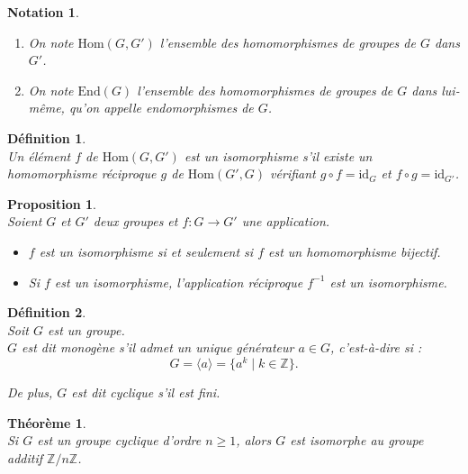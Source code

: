 \documentclass[a4paper, 14pt]{report}
\newtheorem{definition}{Définition}[section]
\newtheorem{notation}{Notation}[section]
\newtheorem{proposition}{Proposition}[section]
\newtheorem{theorem}{Théorème}[section]
\begin{document}
\begin{onehalfspace}
{\begin{notation} \
	\begin{enumerate} [label=\roman*)]
		\item On note $\mathrm{Hom}(G, G')$ l’ensemble des homomorphismes de groupes de $G$ dans $G'$.
		\item  On note $\mathrm{End}(G)$ l’ensemble des homomorphismes de groupes de $G$ dans lui-même, qu’on appelle endomorphismes de $G$.
	\end{enumerate}
\end{notation}

\begin{definition} \cite{schaub1997} \\
Un élément $f$ de $\mathrm{Hom}(G, G')$ est un isomorphisme s’il existe un homomorphisme réciproque $g$ de $\mathrm{Hom}(G', G)$ vérifiant $g \circ f = \mathrm{id}_G$ et $f \circ g = \mathrm{id}_{G'}$.
\end{definition}

\begin{proposition} \cite{hall2018theory} \\
Soient $G$ et $G'$ deux groupes et $f : G \to G'$ une application.
	\begin{itemize}
		\item[(i)] $f$ est un isomorphisme si et seulement si $f$ est un homomorphisme bijectif.
		\item[(ii)] Si $f$ est un isomorphisme, l’application réciproque $f^{-1}$ est un isomorphisme.
	\end{itemize}
\end{proposition}

\begin{definition} \cite{schaub1997}  \\
Soit $G$ est un groupe.\\
\( G \) est dit monogène s'il admet un unique générateur \( a \in G \), c'est-à-dire si :
	\[
	G = \langle a \rangle = \{ a^k \mid k \in \mathbb{Z} \}.
	\]
	
De plus, \( G \) est dit cyclique s'il est fini.
\end{definition}

\begin{theorem} \cite{schaub1997} \\
 Si \( G \) est un groupe cyclique d’ordre \( n \geq 1 \), alors \( G \) est isomorphe au groupe additif \( \mathbb{Z}/n\mathbb{Z} \).
\end{theorem}

}
\end{onehalfspace}
\end{document}
